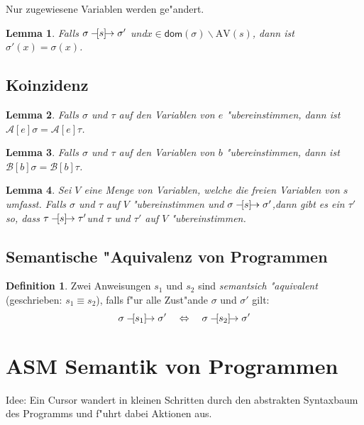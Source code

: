 \documentclass[german,10pt, a4paper, twocolumn]{scrartcl}
\newcommand{\natsemarr}[1]{\ensuremath{-\hspace*{-1.52mm}[#1]\hspace*{-1.61mm}\rightarrow}}
\newtheorem{lemma}{Lemma}[section]
\theoremstyle{definition}
\newtheorem{definition}{Definition}[section]
\theoremstyle{remark}
\begin{document}
Nur zugewiesene Variablen werden ge"andert.
\begin{lemma}
	Falls $\sigma \natsemarr{s} \sigma'$ und\hfill $x\in \textsf{dom}(\sigma)\backslash \mbox{AV}(s)$, dann ist $\sigma'(x)=\sigma(x)$.
\end{lemma}

\subsection{Koinzidenz}

\begin{lemma}
	Falls $\sigma$ und $\tau$ auf den Variablen von $e$ "ubereinstimmen, dann ist $\mathcal{A}[e]\sigma = \mathcal{A}[e]\tau$.
\end{lemma}

\begin{lemma}
	Falls $\sigma$ und $\tau$ auf den Variablen von $b$ "ubereinstimmen, dann ist $\mathcal{B}[b]\sigma = \mathcal{B}[b]\tau$.
\end{lemma}

\begin{lemma}
	Sei $V$ eine Menge von Variablen, welche die freien Variablen von $s$ umfasst. Falls $\sigma$ und $\tau$ auf $V$ "ubereinstimmen und $\sigma \natsemarr{s} \sigma'$,\hfill dann gibt es ein $\tau'$ so, dass $\tau \natsemarr{s} \tau'$\hfill und $\tau$ und $\tau'$ auf $V$ "ubereinstimmen.
\end{lemma}

\subsection{Semantische "Aquivalenz von Programmen}

\begin{definition}
	Zwei Anweisungen $s_1$ und $s_2$ sind \textit{semantsich "aquivalent} (geschrieben: $s_1 \equiv s_2$), falls f"ur alle Zust"ande $\sigma$ und $\sigma'$ gilt:
	\begin{displaymath}
		\sigma \natsemarr{s_1} \sigma' \quad \Leftrightarrow \quad \sigma \natsemarr{s_2} \sigma'
	\end{displaymath}
\end{definition}

\section{ASM Semantik von Programmen}

Idee: Ein Cursor wandert in kleinen Schritten durch den abstrakten Syntaxbaum des Programms und f"uhrt dabei Aktionen aus.
\end{document}
